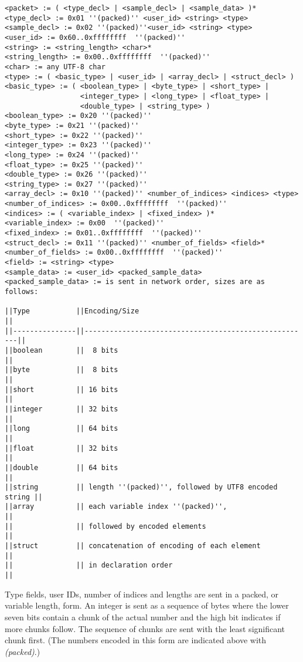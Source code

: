 \documentclass[a4paper]{article}
\begin{document}
\begin{verbatim}
<packet> := ( <type_decl> | <sample_decl> | <sample_data> )*
<type_decl> := 0x01 ''(packed)'' <user_id> <string> <type>
<sample_decl> := 0x02 ''(packed)''<user_id> <string> <type>
<user_id> := 0x60..0xffffffff  ''(packed)''
<string> := <string_length> <char>*
<string_length> := 0x00..0xffffffff  ''(packed)''
<char> := any UTF-8 char
<type> := ( <basic_type> | <user_id> | <array_decl> | <struct_decl> )
<basic_type> := ( <boolean_type> | <byte_type> | <short_type> |
                  <integer_type> | <long_type> | <float_type> | 
                  <double_type> | <string_type> )
<boolean_type> := 0x20 ''(packed)''
<byte_type> := 0x21 ''(packed)''
<short_type> := 0x22 ''(packed)''
<integer_type> := 0x23 ''(packed)''
<long_type> := 0x24 ''(packed)''
<float_type> := 0x25 ''(packed)''
<double_type> := 0x26 ''(packed)''
<string_type> := 0x27 ''(packed)''
<array_decl> := 0x10 ''(packed)'' <number_of_indices> <indices> <type>
<number_of_indices> := 0x00..0xffffffff  ''(packed)''
<indices> := ( <variable_index> | <fixed_index> )*
<variable_index> := 0x00  ''(packed)''
<fixed_index> := 0x01..0xffffffff  ''(packed)''
<struct_decl> := 0x11 ''(packed)'' <number_of_fields> <field>*
<number_of_fields> := 0x00..0xffffffff  ''(packed)''
<field> := <string> <type>
<sample_data> := <user_id> <packed_sample_data>
<packed_sample_data> := is sent in network order, sizes are as follows:

||Type           ||Encoding/Size                                         ||
||---------------||------------------------------------------------------||
||boolean        ||  8 bits                                              ||
||byte           ||  8 bits                                              ||
||short          || 16 bits                                              ||
||integer        || 32 bits                                              ||
||long           || 64 bits                                              ||
||float          || 32 bits                                              ||
||double         || 64 bits                                              ||
||string         || length ''(packed)'', followed by UTF8 encoded string ||
||array          || each variable index ''(packed)'',                    ||
||               || followed by encoded elements                         ||
||struct         || concatenation of encoding of each element            ||
||               || in declaration order                                 ||
\end{verbatim}

Type fields, user IDs, number of indices and lengths are sent in a packed, or
variable length, form.  An integer is sent as a sequence of bytes where the
lower seven bits contain a chunk of the actual number and the high bit
indicates if more chunks follow. The sequence of chunks are sent with the least
significant chunk first.  (The numbers encoded in this form are indicated above
with \textit{(packed)}.)
\end{document}
